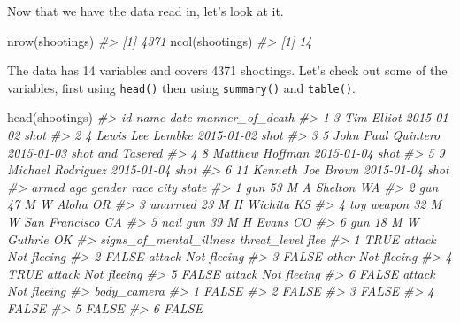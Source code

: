 \documentclass[
]{krantz}
\makeatletter
\newenvironment{Shaded}{\begin{snugshade}}{\end{snugshade}}
\newcommand{\CommentTok}[1]{\textcolor[rgb]{0.37,0.37,0.37}{\textit{#1}}}
\newcommand{\FunctionTok}[1]{\textcolor[rgb]{0,0,0}{#1}}
\newcommand{\NormalTok}[1]{#1}
\newenvironment{kframe}{%
\medskip{}
\setlength{\fboxsep}{.8em}
 \def\at@end@of@kframe{}%
 \ifinner\ifhmode%
  \def\at@end@of@kframe{\end{minipage}}%
  \begin{minipage}{\columnwidth}%
 \fi\fi%
 \def\FrameCommand##1{\hskip\@totalleftmargin \hskip-\fboxsep
 \colorbox{shadecolor}{##1}\hskip-\fboxsep
     \hskip-\linewidth \hskip-\@totalleftmargin \hskip\columnwidth}%
 \MakeFramed {\advance\hsize-\width
   \@totalleftmargin\z@ \linewidth\hsize
   \@setminipage}}%
 {\par\unskip\endMakeFramed%
 \at@end@of@kframe}
\renewenvironment{Shaded}{\begin{kframe}}{\end{kframe}}
\makeatother
\begin{document}
Now that we have the data read in, let's look at it.

\begin{Shaded}
\begin{Highlighting}[]
\FunctionTok{nrow}\NormalTok{(shootings)}
\CommentTok{\#\textgreater{} [1] 4371}
\FunctionTok{ncol}\NormalTok{(shootings)}
\CommentTok{\#\textgreater{} [1] 14}
\end{Highlighting}
\end{Shaded}

The data has 14 variables and covers 4371 shootings. Let's check out some of the variables, first using \texttt{head()} then using \texttt{summary()} and \texttt{table()}.

\begin{Shaded}
\begin{Highlighting}[]
\FunctionTok{head}\NormalTok{(shootings)}
\CommentTok{\#\textgreater{}   id               name       date  manner\_of\_death}
\CommentTok{\#\textgreater{} 1  3         Tim Elliot 2015{-}01{-}02             shot}
\CommentTok{\#\textgreater{} 2  4   Lewis Lee Lembke 2015{-}01{-}02             shot}
\CommentTok{\#\textgreater{} 3  5 John Paul Quintero 2015{-}01{-}03 shot and Tasered}
\CommentTok{\#\textgreater{} 4  8    Matthew Hoffman 2015{-}01{-}04             shot}
\CommentTok{\#\textgreater{} 5  9  Michael Rodriguez 2015{-}01{-}04             shot}
\CommentTok{\#\textgreater{} 6 11  Kenneth Joe Brown 2015{-}01{-}04             shot}
\CommentTok{\#\textgreater{}        armed age gender race          city state}
\CommentTok{\#\textgreater{} 1        gun  53      M    A       Shelton    WA}
\CommentTok{\#\textgreater{} 2        gun  47      M    W         Aloha    OR}
\CommentTok{\#\textgreater{} 3    unarmed  23      M    H       Wichita    KS}
\CommentTok{\#\textgreater{} 4 toy weapon  32      M    W San Francisco    CA}
\CommentTok{\#\textgreater{} 5   nail gun  39      M    H         Evans    CO}
\CommentTok{\#\textgreater{} 6        gun  18      M    W       Guthrie    OK}
\CommentTok{\#\textgreater{}   signs\_of\_mental\_illness threat\_level        flee}
\CommentTok{\#\textgreater{} 1                    TRUE       attack Not fleeing}
\CommentTok{\#\textgreater{} 2                   FALSE       attack Not fleeing}
\CommentTok{\#\textgreater{} 3                   FALSE        other Not fleeing}
\CommentTok{\#\textgreater{} 4                    TRUE       attack Not fleeing}
\CommentTok{\#\textgreater{} 5                   FALSE       attack Not fleeing}
\CommentTok{\#\textgreater{} 6                   FALSE       attack Not fleeing}
\CommentTok{\#\textgreater{}   body\_camera}
\CommentTok{\#\textgreater{} 1       FALSE}
\CommentTok{\#\textgreater{} 2       FALSE}
\CommentTok{\#\textgreater{} 3       FALSE}
\CommentTok{\#\textgreater{} 4       FALSE}
\CommentTok{\#\textgreater{} 5       FALSE}
\CommentTok{\#\textgreater{} 6       FALSE}
\end{Highlighting}
\end{Shaded}
\end{document}
